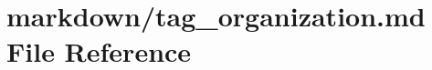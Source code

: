 \hypertarget{tag__organization_8md}{}\section{markdown/tag\+\_\+organization.md File Reference}
\label{tag__organization_8md}
